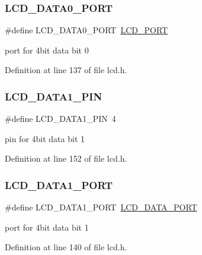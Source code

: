 \subsubsection{\texorpdfstring{LCD\_DATA0\_PORT}{LCD\_DATA0\_PORT}}
{\footnotesize\ttfamily \#define L\+C\+D\+\_\+\+D\+A\+T\+A0\+\_\+\+P\+O\+RT~\mbox{\hyperlink{group__pfleury__lcd_gabcf42bd88b3c36193f301ca25b033875}{L\+C\+D\+\_\+\+P\+O\+RT}}}

port for 4bit data bit 0 

Definition at line 137 of file lcd.\+h.

\mbox{\label{group__pfleury__lcd_ga97fb520e7b83bb047ac5c9247de57049}} 
\subsubsection{\texorpdfstring{LCD\_DATA1\_PIN}{LCD\_DATA1\_PIN}}
{\footnotesize\ttfamily \#define L\+C\+D\+\_\+\+D\+A\+T\+A1\+\_\+\+P\+IN~4}

pin for 4bit data bit 1 

Definition at line 152 of file lcd.\+h.

\mbox{\label{group__pfleury__lcd_ga345af0248d5739bd8896d4f585618ca2}} 
\subsubsection{\texorpdfstring{LCD\_DATA1\_PORT}{LCD\_DATA1\_PORT}}
{\footnotesize\ttfamily \#define L\+C\+D\+\_\+\+D\+A\+T\+A1\+\_\+\+P\+O\+RT~\mbox{\hyperlink{group__pfleury__lcd_ga077def6ebb43bf9aee4e7cad468ed726}{L\+C\+D\+\_\+\+D\+A\+T\+A\+\_\+\+P\+O\+RT}}}

port for 4bit data bit 1 

Definition at line 140 of file lcd.\+h.

\mbox{\label{group__pfleury__lcd_ga7f3d53627337f6535cc8daa35876510a}} 
